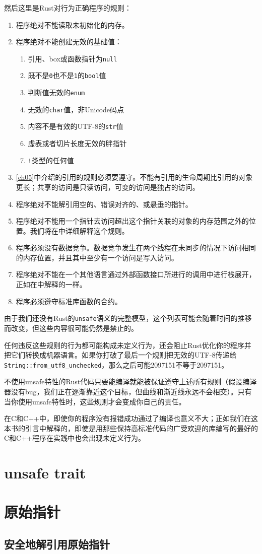 然后这里是Rust对行为正确程序的规则：
\begin{enumerate}
    \item 程序绝对不能读取未初始化的内存。
    \item 程序绝对不能创建无效的基础值：
    \begin{enumerate}
        \item 引用、box或函数指针为\texttt{null}
        \item 既不是\texttt{0}也不是\texttt{1}的\texttt{bool}值
        \item 判断值无效的\texttt{enum}
        \item 无效的\texttt{char}值，非Unicode码点
        \item 内容不是有效的UTF-8的\texttt{str}值
        \item 虚表或者切片长度无效的胖指针
        \item \texttt{!}类型的任何值
    \end{enumerate}
    \item \autoref{ch05}中介绍的引用的规则必须要遵守。不能有引用的生命周期比引用的对象更长；共享的访问是只读访问，可变的访问是独占的访问。
    \item 程序绝对不能解引用空的、错误对齐的、或悬垂的指针。
    \item 程序绝对不能用一个指针去访问超出这个指针关联的对象的内存范围之外的位置。我们将在中详细解释这个规则。
    \item 程序必须没有数据竞争。数据竞争发生在两个线程在未同步的情况下访问相同的内存位置，并且其中至少有一个访问是写入访问。
    \item 程序绝对不能在一个其他语言通过外部函数接口所进行的调用中进行栈展开，正如在中解释的一样。
    \item 程序必须遵守标准库函数的合约。
\end{enumerate}

由于我们还没有Rust的\texttt{unsafe}语义的完整模型，这个列表可能会随着时间的推移而改变，但这些内容很可能仍然是禁止的。

任何违反这些规则的行为都可能构成未定义行为，还会阻止Rust优化你的程序并把它们转换成机器语言。如果你打破了最后一个规则把无效的UTF-8传递给\texttt{String::from\_utf8\_unchecked}，那么之后可能2097151不等于2097151。

不使用unsafe特性的Rust代码只要能编译就能被保证遵守上述所有规则（假设编译器没有bug，我们正在逐渐靠近这个目标，但曲线和渐近线永远不会相交）。只有当你使用unsafe特性时，这些规则才会变成你自己的责任。

在C和C++中，即使你的程序没有报错成功通过了编译也意义不大；正如我们在这本书的引言中解释的，即使是用那些保持高标准代码的广受欢迎的库编写的最好的C和C++程序在实践中也会出现未定义行为。

\section{unsafe trait}


\section{原始指针}\label{rawp}

\subsection{安全地解引用原始指针}\label{DerefRawP}